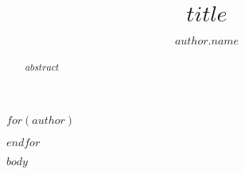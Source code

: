 \documentclass[a4paper]{article}
\begin{document}
%
\title{$title$}
%
%
$for(author)$
\author{
	$author.name$%
}

$endfor$



\date{}

%
\maketitle              %
%
\begin{abstract}
$abstract$
\end{abstract}


$body$

\printbibliography
%
%
%
\end{document}
